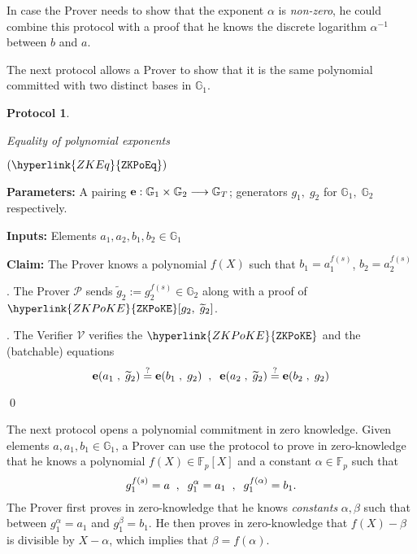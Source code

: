 \documentclass[11pt, lettersize, notitlepage, leqno, footskip=0.6cm]{article}
\newcommand{\bFp}{\mathbb{F}_p}
\newcommand{\lra}{\longrightarrow}
\newcommand{\wti}{\widetilde}
\newcommand{\mc}{\mathcal}
\newcommand{\mb}{\mathbb}
\newcommand{\mbf}{\mathbf}
\newcommand{\al}{\alpha}
\newcommand{\be}{\beta}
\newcommand{\mP}{\mc{P}}
\newcommand{\V}{\mc{V}}
\newcommand{\vs}{\vspace{-0.15cm}}
\newcommand{\noin}{\noindent}
\newcommand{\sta}{\stackrel{?}{=}}
\newcommand{\e}{\mbf{e}}
\newtheorem{Prot}[Thm]{Protocol}
\numberwithin{equation}{section}
\begin{document}
In case the Prover needs to show that the exponent $\al$ is \textit{non-zero}, he could combine this protocol with a proof that he knows the discrete logarithm $\al^{-1}$ between $b$ and $a$.


\bigskip











The next protocol allows a Prover to show that it is the same polynomial committed with two distinct bases in $\mb{G}_1$.


\bigskip



\begin{mdframed}
\begin{Prot} \hypertarget{Eq}{Equality of polynomial exponents}  $(\hyperlink{ZKEq}{\tt{ZKPoEq}})$\end{Prot}  

\noin \textbf{Parameters:} A pairing ${\bf{e}}:\mb{G}_1\times \mb{G}_2\lra \mb{G}_T$; generators $g_1,\;g_2$ for $\mb{G}_1,\; \mb{G}_2$ respectively.


\noindent \textbf{Inputs:} Elements $a_1,a_2, b_1,b_2\in \mb{G}_1$

\noin \textbf{Claim:} The Prover knows a polynomial $f(X)$ such that $b_1 = a_1^{f(s)}$, $b_2 = a_2^{f(s)}$ \vspace{2mm}

\noin 1. The Prover $\mP$ sends $\wti{g}_2:= g_2^{f(s)}\in \mb{G}_2$ along with a proof of $\hyperlink{ZKPoKE}{\tt{ZKPoKE}}[g_2,\;\wti{g}_2]$.

\noin 2. The Verifier $\V$ verifies the $\hyperlink{ZKPoKE}{\tt{ZKPoKE}}$ and the (batchable) equations \vs $$ \e(a_1\;,\; \wti{g}_2)\sta \e(b_1\;,\; g_2)\;\;,\;\; \e(a_2 \;,\; \wti{g}_2)\sta \e(b_2\;,\; g_2)  \vspace{-7mm} $$

\qed \end{mdframed}


\bigskip


The next protocol opens a polynomial commitment in zero knowledge. Given elements $a, a_1, b_1\in \mb{G}_1$, a Prover can use the protocol to prove in zero-knowledge that  he knows a polynomial $f(X)\in \bFp[X]$ and a constant $\al\in \bFp$ such that \vs $$g_1^{f(s)} = a\;\;,\;\; g_1^{\al} = a_1\;\;,\;\;g_1^{f(\al)} = b_1. \vs $$ The Prover first proves in zero-knowledge that  he knows \textit{constants} $\al,\be$ such that between $g_1^{\al} = a_1$ and $g_1^{\be} = b_1$. He then proves in zero-knowledge that  $f(X)-\be$ is divisible by $X-\al$, which implies that $\be = f(\al)$. 
\end{document}

